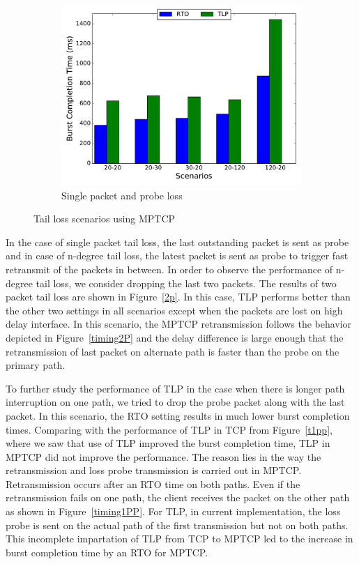 \documentclass[10pt,conference,compsoc]{IEEEtran}
\begin{document}
\begin{figure}[!tbp]
\begin{subfigure}[b]{0.32\textwidth}
\includegraphics[angle=0, width=\textwidth, natwidth=578.16,natheight=433.62]{plots/1PP.pdf}
\caption{Single packet and probe loss}\label{1pp}
 \end{subfigure}
 \caption{Tail loss scenarios using MPTCP}
\end{figure}





In the case of single packet tail loss, the last outstanding packet is sent as probe and in case of n-degree tail loss,
the latest packet is sent as probe to trigger fast retransmit of the packets in between. In order to observe
the performance of n-degree tail loss, we consider dropping the last two packets. 
The results of two packet tail loss are shown in Figure~\ref{2p}. In this case, TLP performs better than the other 
two settings in all scenarios except when the packets are lost on high delay interface. In this scenario, the MPTCP retransmission follows the 
behavior depicted in Figure~\ref{timing2P} and the delay difference is large enough that the retransmission of last packet on alternate path is 
faster than the probe on the primary path. 


To further study the performance of TLP in the case when there is longer path interruption on one path, we tried to drop the probe packet along with the last packet. In this scenario, the RTO
setting results in much lower burst completion times. Comparing with the performance of TLP in TCP from Figure~\ref{t1pp}, where we saw that use of TLP improved the burst completion time, TLP in MPTCP did not improve the performance. The reason lies in the way the retransmission and loss probe transmission is carried out in MPTCP. Retransmission occurs after an RTO time on both paths.
Even if the retransmission fails on one path, the client receives the packet on the other path as shown in Figure~\ref{timing1PP}. For TLP, in
current implementation, the loss probe is sent on the actual path of the first transmission but not on both paths. This incomplete impartation of
TLP from TCP to MPTCP led to the increase in burst completion time by an RTO for MPTCP. 
\end{document}
